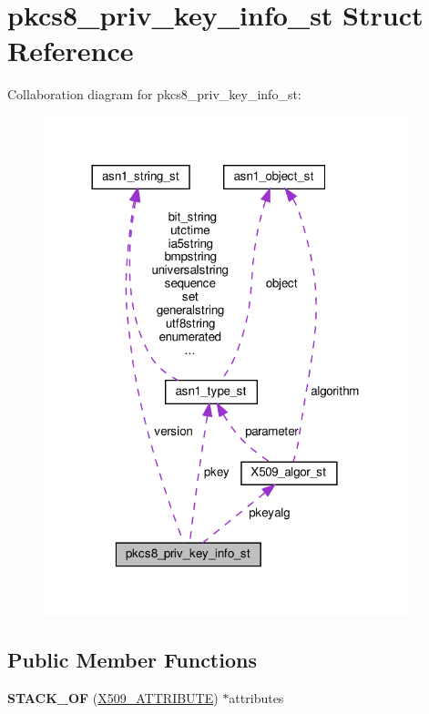 \hypertarget{structpkcs8__priv__key__info__st}{}\section{pkcs8\+\_\+priv\+\_\+key\+\_\+info\+\_\+st Struct Reference}
\label{structpkcs8__priv__key__info__st}


Collaboration diagram for pkcs8\+\_\+priv\+\_\+key\+\_\+info\+\_\+st\+:
\nopagebreak
\begin{figure}[H]
\begin{center}
\leavevmode
\includegraphics[width=300pt]{structpkcs8__priv__key__info__st__coll__graph}
\end{center}
\end{figure}
\subsection*{Public Member Functions}
\begin{DoxyCompactItemize}
\item 
\mbox{\label{structpkcs8__priv__key__info__st_a48e04287be17d39efa8f5c0dc7512851}} 
{\bfseries S\+T\+A\+C\+K\+\_\+\+OF} (\hyperlink{structx509__attributes__st}{X509\+\_\+\+A\+T\+T\+R\+I\+B\+U\+TE}) $\ast$attributes
\end{DoxyCompactItemize}

